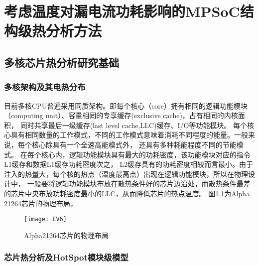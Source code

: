 

\chapter{考虑温度对漏电流功耗影响的MPSoC结构级热分析方法}
\label{cha:SSTA}


\section{多核芯片热分析研究基础}
\label{sec:SSTAbasic}

\subsection{多核架构及其电热分布}

目前多核CPU普遍采用同质架构。即每个核心（core）拥有相同的逻辑功能模块（computing unit）、容量相同的专享缓存(exclusive cache)，占有相同的内核面积， 同时共享最后一级缓存(last level cache,LLC)缓存、I/O等功能模块。 每个核心具有相同数量的工作模式，不同的工作模式意味着消耗不同程度的能量。一般来说，每个核心除具有一个全速高能模式外， 还具有多种耗能程度不同的节能模式。
在每个核心内，逻辑功能模块具有最大的功耗密度，该功能模块对应的指令L1缓存和数据L1缓存功耗密度次之， L2缓存具有的功耗密度相较而言最小。由于注入的热量大，每个核的热点（温度最高点）出现在逻辑功能模块，所以在物理设计中， 一般要将逻辑功能模块布放在散热条件好的芯片边沿处，而散热条件最差的芯片中央布放功耗密度最小的LLC，从而降低芯片的热点温度。 图\ref{fig:ev6}为Alpha 21264芯片的物理布局，

\begin{figure}[H]
  \centering
  \texttt{[image: EV6]}
  \caption{Alpha21264芯片的物理布局}
  \label{fig:ev6}
\end{figure}


\subsection{芯片热分析及HotSpot模块级模型}

